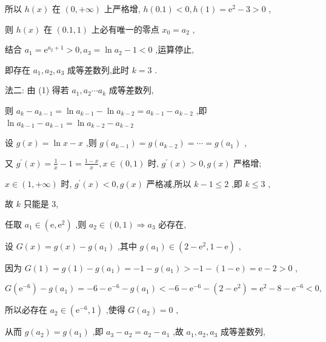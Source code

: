 \documentclass[10pt]{article}
\begin{document}
所以 \(h\left( x\right)\) 在 \(\left( {0, + \infty }\right)\) 上严格增, \(h\left( {0.1}\right)  < 0,h\left( 1\right)  = {\mathrm{e}}^{2} - 3 > 0\) ,

则 \(h\left( x\right)\) 在 \(\left( {{0.1},1}\right)\) 上必有唯一的零点 \({x}_{0} = {a}_{2}\) ,

结合 \({a}_{1} = {\mathrm{e}}^{{a}_{2} + 1} > 0,{a}_{3} = \ln {a}_{2} - 1 < 0\) ,运算停止,

即存在 \({a}_{1},{a}_{2},{a}_{3}\) 成等差数列,此时 \(k = 3\) .

法二: 由 (1) 得若 \({a}_{1},{a}_{2}\cdots {a}_{k}\) 成等差数列,

则 \({a}_{k} - {a}_{k - 1} = \ln {a}_{k - 1} - \ln {a}_{k - 2} = {a}_{k - 1} - {a}_{k - 2}\) ,即 \(\ln {a}_{k - 1} - {a}_{k - 1} = \ln {a}_{k - 2} - {a}_{k - 2}\)

设 \(g\left( x\right)  = \ln x - x\) ,则 \(g\left( {a}_{k - 1}\right)  = g\left( {a}_{k - 2}\right)  = \cdots  = g\left( {a}_{1}\right)\) ,

又 \({g}^{\prime }\left( x\right)  = \frac{1}{x} - 1 = \frac{1 - x}{x},x \in  \left( {0,1}\right)\) 时, \({g}^{\prime }\left( x\right)  > 0,g\left( x\right)\) 严格增;

\(x \in  \left( {1, + \infty }\right)\) 时, \({g}^{\prime }\left( x\right)  < 0,g\left( x\right)\) 严格减,所以 \(k - 1 \leq  2\) ,即 \(k \leq  3\) ,

故 \(k\) 只能是 3,

任取 \({a}_{1} \in  \left( {\mathrm{e},{\mathrm{e}}^{2}}\right)\) ,则 \({a}_{2} \in  \left( {0,1}\right)  \Rightarrow  {a}_{3}\) 必存在,

设 \(G\left( x\right)  = g\left( x\right)  - g\left( {a}_{1}\right)\) ,其中 \(g\left( {a}_{1}\right)  \in  \left( {2 - {\mathrm{e}}^{2},1 - \mathrm{e}}\right)\) ,

因为 \(G\left( 1\right)  = g\left( 1\right)  - g\left( {a}_{1}\right)  =  - 1 - g\left( {a}_{1}\right)  >  - 1 - \left( {1 - \mathrm{e}}\right)  = \mathrm{e} - 2 > 0\) ,

\(G\left( {\mathrm{e}}^{-6}\right)  - g\left( {a}_{1}\right)  =  - 6 - {\mathrm{e}}^{-6} - g\left( {a}_{1}\right)  <  - 6 - {\mathrm{e}}^{-6} - \left( {2 - {\mathrm{e}}^{2}}\right)  = {\mathrm{e}}^{2} - 8 - {\mathrm{e}}^{-6} < 0,\)

所以必存在 \({a}_{2} \in  \left( {{\mathrm{e}}^{-6},1}\right)\) ,使得 \(G\left( {a}_{2}\right)  = 0\) ,

从而 \(g\left( {a}_{2}\right)  = g\left( {a}_{1}\right)\) ,即 \({a}_{3} - {a}_{2} = {a}_{2} - {a}_{1}\) ,故 \({a}_{1},{a}_{2},{a}_{3}\) 成等差数列,
\end{document}
